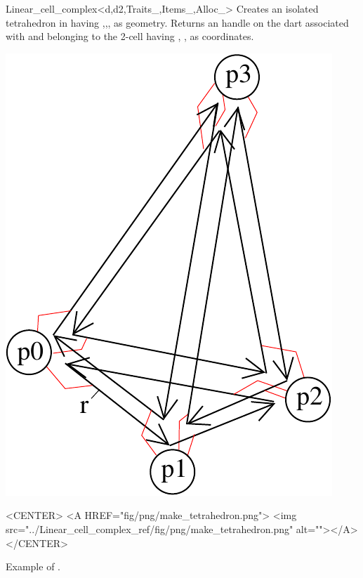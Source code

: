 \begin{ccRefClass}{Linear_cell_complex<d,d2,Traits_,Items_,Alloc_>}
{Creates an isolated tetrahedron in  having  ,,, as geometry.
  Returns an handle on the dart associated with  and
  belonging to the 2-cell having , , 
  as coordinates.
}
%
\def\LargFig{.3\textwidth}
  \begin{ccTexOnly}
    \begin{center}
      \includegraphics[width=\LargFig]{Linear_cell_complex_ref/fig/pdf/make_tetrahedron}
    \end{center}
  \end{ccTexOnly}
  \begin{ccHtmlOnly}
    <CENTER>
    <A HREF="fig/png/make_tetrahedron.png">
        <img src="../Linear_cell_complex_ref/fig/png/make_tetrahedron.png" alt=""></A>
    </CENTER>
    \end{ccHtmlOnly}
    \centerline{Example of .}


\end{ccRefClass}
